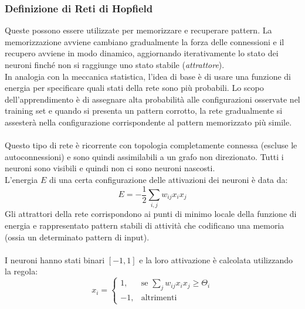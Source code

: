 \documentclass[12pt, a4paper]{article}
\begin{document}
\subsubsection{Definizione di Reti di Hopfield}
Queste possono essere utilizzate per memorizzare e recuperare pattern. La memorizzazione avviene cambiano gradualmente la forza delle connessioni e il recupero avviene in modo dinamico, aggiornando iterativamente lo stato dei neuroni finché non si raggiunge uno stato stabile (\textit{attrattore}).\\
In analogia con la meccanica statistica, l'idea di base è di usare una funzione di energia per specificare quali stati della rete sono più probabili. Lo scopo dell'apprendimento è di assegnare alta probabilità alle configurazioni osservate nel training set e quando si presenta un pattern corrotto, la rete gradualmente si assesterà nella configurazione corrispondente al pattern memorizzato più simile.\\
\\
Questo tipo di rete è ricorrente con topologia completamente connessa (escluse le autoconnessioni) e sono quindi assimilabili a un grafo non direzionato. Tutti i neuroni sono visibili e quindi non ci sono neuroni nascosti.\\
L'energia \(E\) di una certa configurazione delle attivazioni dei neuroni è data da:
\[E=-\frac{1}{2}\sum_{i,j}w_{ij}x_ix_j\]
Gli attrattori della rete corrispondono ai punti di minimo locale della funzione di energia e rappresentato pattern stabili di attività che codificano una memoria (ossia un determinato pattern di input).\\
\\
I neuroni hanno stati binari \([-1, 1]\) e la loro attivazione è calcolata utilizzando la regola:
\[
    x_i = 
    \begin{cases} 
        1, & \mbox{se } \sum_j w_{ij}x_ix_j \geq \Theta_i \\
        -1, & \mbox{altrimenti}
    \end{cases}
\]
\end{document}
